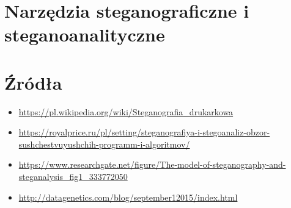 \documentclass{article}
\begin{document}
\section{Narzędzia steganograficzne i steganoanalityczne}
\section{Źródła}
\begin{itemize}
	\item \url{https://pl.wikipedia.org/wiki/Steganografia_drukarkowa}
	\item \url{https://royalprice.ru/pl/setting/steganografiya-i-stegoanaliz-obzor-sushchestvuyushchih-programm-i-algoritmov/}
	\item \url{https://www.researchgate.net/figure/The-model-of-steganography-and-steganalysis_fig1_333772050}
	\item \url{http://datagenetics.com/blog/september12015/index.html}
\end{itemize}
\end{document}
